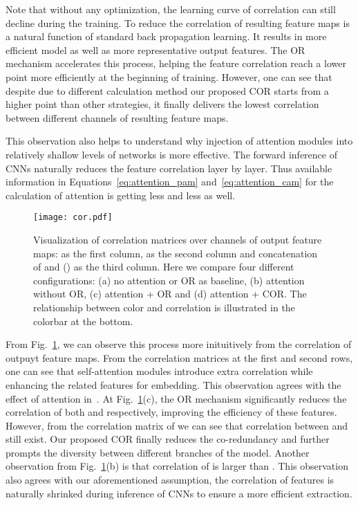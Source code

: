 \documentclass[journal]{IEEEtran}
\begin{document}
Note that without any optimization, the learning curve of correlation can still decline during the training.
To reduce the correlation of resulting feature maps is a natural function of standard back propagation learning.
It results in more efficient model as well as more representative output features.
The OR mechanism accelerates this process, helping the feature correlation reach a lower point more efficiently at the beginning of training.
However, one can see that despite due to different calculation method our proposed COR starts from a higher point than other strategies, it finally delivers the lowest correlation between different channels of resulting feature maps.

This observation also helps to understand why injection of attention modules into relatively shallow levels of networks is more effective.
The forward inference of CNNs naturally reduces the feature correlation layer by layer.
Thus available information in Equations~\ref{eq:attention_pam} and~\ref{eq:attention_cam} for the calculation of attention is getting less and less as well. 
\begin{figure}
\begin{center}
  \centerline{\texttt{[image: cor.pdf]}}
  \caption{Visualization of correlation matrices over channels of output feature maps:  as the first column,  as the second column and concatenation of  and  () as the third column.
  Here we compare four different configurations: (a) no attention or OR as baseline, (b) attention without OR, (c) attention + OR and (d) attention + COR.
  The relationship between color and correlation is illustrated in the colorbar at the bottom.}
  \label{fig:cor}
  \end{center}
\end{figure}

From Fig.~\ref{fig:cor}, we can observe this process more inituitively from the correlation of outpuyt feature maps.
From the correlation matrices at the first and second rows, one can see that self-attention modules introduce extra correlation while enhancing the related features for embedding.
This observation agrees with the effect of attention in~\cite{chen2019ABD}.
At Fig.~\ref{fig:cor}(c), the OR mechanism significantly reduces the correlation of both  and  respectively, improving the efficiency of these features.
However, from the correlation matrix of  we can see that correlation between  and  still exist.
Our proposed COR finally reduces the co-redundancy and further prompts the diversity between different branches of the model.
Another observation from Fig.~\ref{fig:cor}(b) is that correlation of  is larger than .
This observation also agrees with our aforementioned assumption, the correlation of features is naturally shrinked during inference of CNNs to ensure a more efficient extraction.
\end{document}
